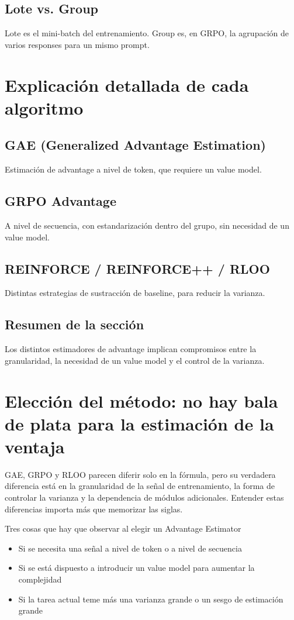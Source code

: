 \documentclass[a4paper]{article}
\begin{document}
\subsection{Lote vs. Group}
Lote es el mini-batch del entrenamiento. Group es, en GRPO, la agrupación de varios responses para un mismo prompt.

\section{Explicación detallada de cada algoritmo}
\subsection{GAE (Generalized Advantage Estimation)}
Estimación de advantage a nivel de token, que requiere un value model.

\subsection{GRPO Advantage}
A nivel de secuencia, con estandarización dentro del grupo, sin necesidad de un value model.

\subsection{REINFORCE / REINFORCE++ / RLOO}
Distintas estrategias de sustracción de baseline, para reducir la varianza.

\subsection{Resumen de la sección}
Los distintos estimadores de advantage implican compromisos entre la granularidad, la necesidad de un value model y el control de la varianza.

\newpage
\section{Elección del método: no hay bala de plata para la estimación de la ventaja}
GAE, GRPO y RLOO parecen diferir solo en la fórmula, pero su verdadera diferencia está en la granularidad de la señal de entrenamiento, la forma de controlar la varianza y la dependencia de módulos adicionales. Entender estas diferencias importa más que memorizar las siglas.

\begin{knowledgebox}{Tres cosas que hay que observar al elegir un Advantage Estimator}
\begin{itemize}
  \item Si se necesita una señal a nivel de token o a nivel de secuencia
  \item Si se está dispuesto a introducir un value model para aumentar la complejidad
  \item Si la tarea actual teme más una varianza grande o un sesgo de estimación grande
\end{itemize}
\end{knowledgebox}
\end{document}
